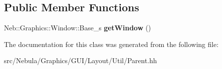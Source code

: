 \subsection*{\-Public \-Member \-Functions}
\begin{DoxyCompactItemize}
\item 
\hypertarget{classNeb_1_1Graphics_1_1GUI_1_1Layout_1_1Util_1_1Parent_a89c94a9f0932ea162fd287df75374016}{\-Neb\-::\-Graphics\-::\-Window\-::\-Base\-\_\-s {\bfseries get\-Window} ()}\label{classNeb_1_1Graphics_1_1GUI_1_1Layout_1_1Util_1_1Parent_a89c94a9f0932ea162fd287df75374016}

\end{DoxyCompactItemize}


\-The documentation for this class was generated from the following file\-:\begin{DoxyCompactItemize}
\item 
src/\-Nebula/\-Graphics/\-G\-U\-I/\-Layout/\-Util/\-Parent.\-hh\end{DoxyCompactItemize}
